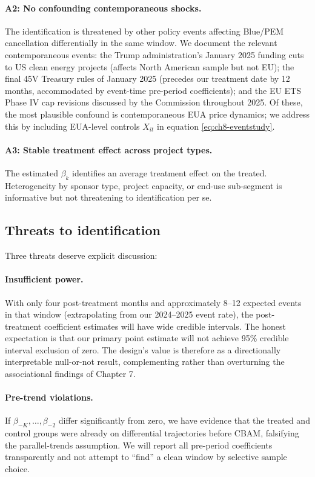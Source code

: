 \documentclass[11pt,a4paper]{article}
\begin{document}
\paragraph{A2: No confounding contemporaneous shocks.} The identification is threatened by other policy events affecting Blue/PEM cancellation differentially in the same window. We document the relevant contemporaneous events: the Trump administration's January 2025 funding cuts to US clean energy projects (affects North American sample but not EU); the final 45V Treasury rules of January 2025 (precedes our treatment date by 12 months, accommodated by event-time pre-period coefficients); and the EU ETS Phase IV cap revisions discussed by the Commission throughout 2025. Of these, the most plausible confound is contemporaneous EUA price dynamics; we address this by including EUA-level controls $X_{it}$ in equation \eqref{eq:ch8-eventstudy}.

\paragraph{A3: Stable treatment effect across project types.} The estimated $\beta_k$ identifies an average treatment effect on the treated. Heterogeneity by sponsor type, project capacity, or end-use sub-segment is informative but not threatening to identification per se.

\subsection{Threats to identification}

Three threats deserve explicit discussion:

\paragraph{Insufficient power.} With only four post-treatment months and approximately 8--12 expected events in that window (extrapolating from our 2024--2025 event rate), the post-treatment coefficient estimates will have wide credible intervals. The honest expectation is that our primary point estimate will not achieve 95\% credible interval exclusion of zero. The design's value is therefore as a directionally interpretable null-or-not result, complementing rather than overturning the associational findings of Chapter 7.

\paragraph{Pre-trend violations.} If $\beta_{-K}, \ldots, \beta_{-2}$ differ significantly from zero, we have evidence that the treated and control groups were already on differential trajectories before CBAM, falsifying the parallel-trends assumption. We will report all pre-period coefficients transparently and not attempt to ``find'' a clean window by selective sample choice.
\end{document}
